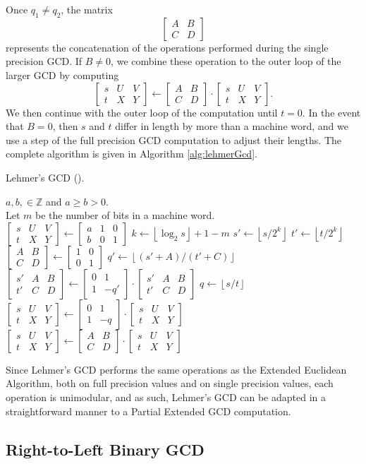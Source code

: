 \documentclass{ucalgthes1}
\theoremstyle{definition}
\newcommand{\ZZ}{\mathbb{Z}}
\newcommand{\matrixtt}[4]{\left[ \begin{array}{rr} #1 & #2 \\ #3 & #4 \end{array} \right]}
\newcommand{\matrixThreeTwo}[6]{\left[ \begin{array}{rrr} #1 & #2 & #3 \\ #4 & #5 & #6 \end{array} \right]}
\newcommand{\floor}[1]{\left\lfloor #1 \right\rfloor}
\begin{document}
Once $q_1 \neq q_2$, the matrix
\[
\matrixtt{A}{B}{C}{D}
\]
represents the concatenation of the operations performed during the single precision GCD.  If $B \neq 0$, we combine these operation to the outer loop of the larger GCD by computing
\[
\matrixThreeTwo{s}{U}{V}{t}{X}{Y} \gets \matrixtt{A}{B}{C}{D}
		        \cdot \matrixThreeTwo{s}{U}{V}{t}{X}{Y}.
\]
We then continue with the outer loop of the computation until $t = 0$.  In the event that $B=0$, then $s$ and $t$ differ in length by more than a machine word, and we use a step of the full precision GCD computation to adjust their lengths.  The complete algorithm is given in Algorithm \ref{alg:lehmerGcd}.

\begin{algorithm}[h]
\caption{Lehmer's GCD (\cite{Lehmer1938}).}
\label{alg:lehmerGcd}
\begin{algorithmic}[1]
\REQUIRE $a,b, \in \ZZ$ and $a \ge b > 0$. \\
         Let $m$ be the number of bits in a machine word. \\
\STATE $\matrixThreeTwo{s}{U}{V}{t}{X}{Y} \gets \matrixThreeTwo{a}{1}{0}{b}{0}{1}$
	\STATE $k \gets \floor{\log_2 s} + 1 - m$
	\STATE $s' \gets \floor{s / 2^k}$ 
	\STATE $t' \gets \floor{t / 2^k}$
	\STATE $\matrixtt{A}{B}{C}{D} \gets \matrixtt{1}{0}{0}{1}$
	\WHILE{$t' \neq 0$ and $\floor{(s'+A)/(t'+C)} = \floor{(s'+B)/(t'+D)}$}
		\STATE $q' \gets \floor{(s'+A)/(t'+C)}$ 
		\STATE $\matrixThreeTwo{s'}{A}{B}{t'}{C}{D} \gets \matrixtt{0}{1}{1}{-q'}
			    \cdot \matrixThreeTwo{s'}{A}{B}{t'}{C}{D}$
	\ENDWHILE
		\STATE $q \gets \floor{s/t}$  
		\STATE $\matrixThreeTwo{s}{U}{V}{t}{X}{Y} \gets \matrixtt{0}{1}{1}{-q}
		        \cdot \matrixThreeTwo{s}{U}{V}{t}{X}{Y}$
	\ELSE
		\STATE $\matrixThreeTwo{s}{U}{V}{t}{X}{Y} \gets \matrixtt{A}{B}{C}{D}
		        \cdot \matrixThreeTwo{s}{U}{V}{t}{X}{Y}$ 
	\ENDIF
\ENDWHILE
\end{algorithmic}
\end{algorithm}

Since Lehmer's GCD performs the same operations as the Extended Euclidean Algorithm, both on full precision values and on single precision values, each operation is unimodular, and as such, Lehmer's GCD can be adapted in a straightforward manner to a Partial Extended GCD computation.

\subsection{Right-to-Left Binary GCD}
\label{subsec:r2lBinGcd}
\end{document}

